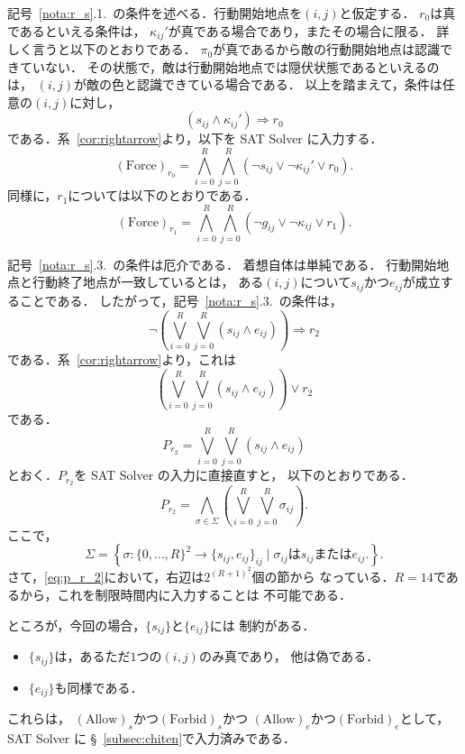 記号~\ref{nota:r_s}.1.~の条件を述べる．行動開始地点を$(i, j)$と仮定する．
$r_0$は真であるといえる条件は，
$\kappa_{ij}'$が真である場合であり，またその場合に限る．
詳しく言うと以下のとおりである．
$\pi_0$が真であるから敵の行動開始地点は認識できていない．
その状態で，敵は行動開始地点では隠伏状態であるといえるのは，
$(i, j)$が敵の色と認識できている場合である．
以上を踏まえて，条件は任意の$(i, j)$に対し，
\[
 (s_{ij} \land \kappa_{ij}') \Rightarrow r_0
\]
である．系~\ref{cor:rightarrow}より，以下を SAT Solver に入力する．
\[
 (\text{Force})_{r_0} = \bigwedge_{i = 0}^R \bigwedge_{j = 0}^R 
 (\lnot s_{ij} \lor \lnot \kappa_{ij}' \lor r_0).
\]
同様に，$r_1$については以下のとおりである．
\[
 (\text{Force})_{r_1} = \bigwedge_{i = 0}^R \bigwedge_{j = 0}^R 
 (\lnot g_{ij} \lor \lnot \kappa_{ij} \lor r_1).
\]

記号~\ref{nota:r_s}.3.~の条件は厄介である．
着想自体は単純である．
行動開始地点と行動終了地点が一致しているとは，
ある$(i, j)$について$s_{ij}$かつ$e_{ij}$が成立することである．
したがって，記号~\ref{nota:r_s}.3.~の条件は，
\[
 \lnot \left( \bigvee_{i=0}^R \bigvee_{j=0}^R (s_{ij} \land e_{ij})
 \right)
 \Rightarrow r_2
\]
である．系~\ref{cor:rightarrow}より，これは
\[
 \left( \bigvee_{i=0}^R \bigvee_{j=0}^R (s_{ij} \land e_{ij})
 \right) \lor r_2
\]
である．
\begin{equation}
 P_{r_2} = \bigvee_{i=0}^R \bigvee_{j=0}^R (s_{ij} \land e_{ij})
  \label{eq:p_r_2_original}
\end{equation}
とおく．$P_{r_2}$を SAT Solver の入力に直接直すと，
以下のとおりである．
\begin{equation}
  P_{r_2} = \bigwedge_{\sigma \in \Sigma}
   \left( 
    \bigvee_{i=0}^R \bigvee_{j=0}^R \sigma_{ij} \right).
  \label{eq:p_r_2}
\end{equation}
ここで，
\[
 \Sigma = \left\{ \sigma \colon \{0, \dots, R \}^2 \to \{ s_{ij} , e_{ij}
 \}_{ij} \mid \sigma_{ij} \text{は} s_{ij} \text{または} e_{ij}.
 \right\}.
\]
さて，\eqref{eq:p_r_2}において，右辺は$2^{(R+1)^2}$個の節から
なっている．$R = 14$であるから，これを制限時間内に入力することは
不可能である．

ところが，今回の場合，$\{ s_{ij} \}$と$\{ e_{ij} \}$には
制約がある．
\begin{itemize}
 \item $\{ s_{ij} \}$は，あるただ$1$つの$(i, j)$のみ真であり，
       他は偽である．
 \item $\{ e_{ij} \}$も同様である．
\end{itemize}
これらは，
$(\text{Allow})_s$かつ$(\text{Forbid})_s$かつ
$(\text{Allow})_e$かつ$(\text{Forbid})_e$として，
SAT Solver に
\S~\ref{subsec:chiten}で入力済みである．


